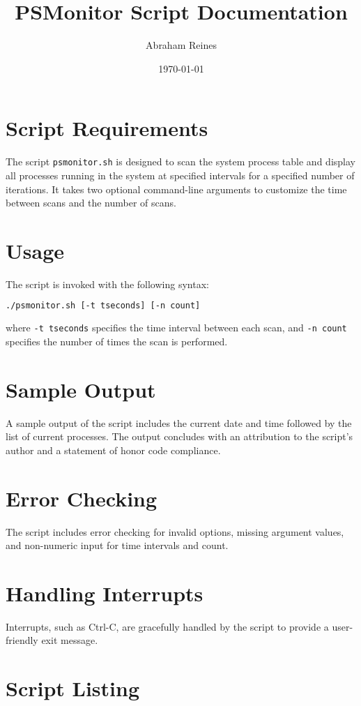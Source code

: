 \documentclass{article}
\title{PSMonitor Script Documentation}
\author{Abraham Reines}
\date{\today}
\begin{document}
\maketitle

\section{Script Requirements}
The script \texttt{psmonitor.sh} is designed to scan the system process table and display all processes running in the system at specified intervals for a specified number of iterations. It takes two optional command-line arguments to customize the time between scans and the number of scans.

\section{Usage}
The script is invoked with the following syntax:
\begin{lstlisting}[language=bash]
./psmonitor.sh [-t tseconds] [-n count]
\end{lstlisting}
where \texttt{-t tseconds} specifies the time interval between each scan, and \texttt{-n count} specifies the number of times the scan is performed.

\section{Sample Output}
A sample output of the script includes the current date and time followed by the list of current processes. The output concludes with an attribution to the script's author and a statement of honor code compliance.

\section{Error Checking}
The script includes error checking for invalid options, missing argument values, and non-numeric input for time intervals and count.

\section{Handling Interrupts}
Interrupts, such as Ctrl-C, are gracefully handled by the script to provide a user-friendly exit message.

\section{Script Listing}

\end{document}
